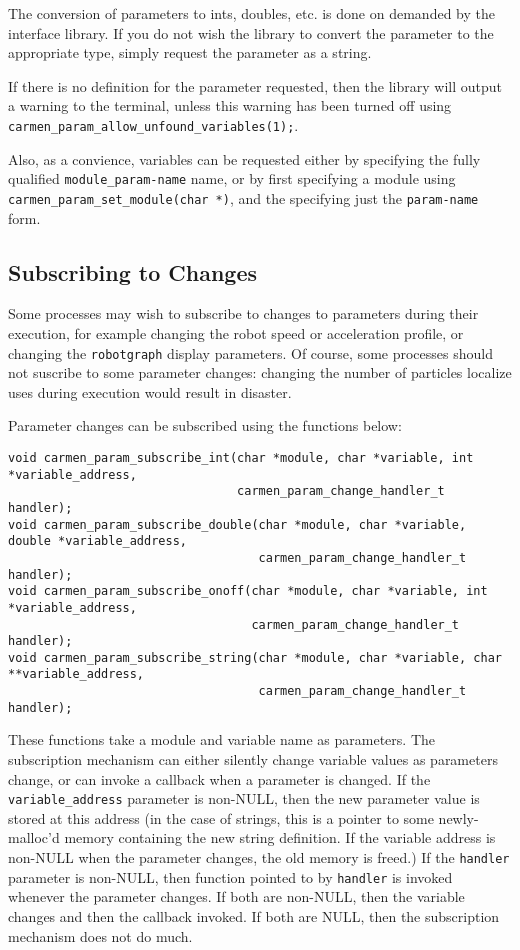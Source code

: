 \documentclass{article}
\begin{document}
The conversion of parameters to ints, doubles, etc. is done on demanded by the
interface library. If you do not wish the library to convert the parameter to
the appropriate type, simply request the parameter as a string.

If there is no definition for the parameter requested, then the library will
output a warning to the terminal, unless this warning has been turned off
using \verb!carmen_param_allow_unfound_variables(1);!. 

Also, as a convience, variables can be requested either by specifying the
fully qualified \verb!module_param-name! name, or by first specifying a module
using \verb!carmen_param_set_module(char *)!, and the specifying just the
\verb!param-name! form. 

\subsection{Subscribing to Changes}

Some processes may wish to subscribe to changes to parameters during their
execution, for example changing the robot speed or acceleration profile, or
changing the \verb!robotgraph! display parameters. Of course, some processes
should not suscribe to some parameter changes: changing the number of
particles localize uses during execution would result in disaster.

Parameter changes can be subscribed using the functions below:
\begin{verbatim}
void carmen_param_subscribe_int(char *module, char *variable, int *variable_address, 
                                carmen_param_change_handler_t handler);
void carmen_param_subscribe_double(char *module, char *variable, double *variable_address, 
                                   carmen_param_change_handler_t handler);
void carmen_param_subscribe_onoff(char *module, char *variable, int *variable_address, 
                                  carmen_param_change_handler_t handler);
void carmen_param_subscribe_string(char *module, char *variable, char **variable_address, 
                                   carmen_param_change_handler_t handler);
\end{verbatim}

These functions take a module and variable name as parameters. The
subscription mechanism can either silently change variable values as
parameters change, or can invoke a callback when a parameter is changed. If
the \verb!variable_address! parameter is non-NULL, then the new parameter
value is stored at this address (in the case of strings, this is a pointer to
some newly-malloc'd memory containing the new string definition. If the
variable address is non-NULL when the parameter changes, the old memory is
freed.) If the \verb!handler! parameter is non-NULL, then function pointed to
by \verb!handler! is invoked whenever the parameter changes. If both are
non-NULL, then the variable changes and then the callback invoked. If both are
NULL, then the subscription mechanism does not do much. 
\end{document}
